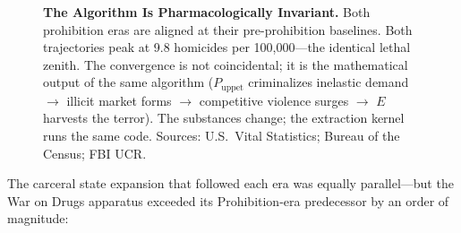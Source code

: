 \documentclass[12pt,openany]{book}
\begin{document}
\begin{figure}[htbp]
\begin{tikzpicture}
\end{tikzpicture}
\caption{\textbf{The Algorithm Is Pharmacologically Invariant.} Both prohibition eras are aligned at their pre-prohibition baselines. Both trajectories peak at 9.8 homicides per 100,000---the identical lethal zenith. The convergence is not coincidental; it is the mathematical output of the same algorithm ($P_{\text{uppet}}$ criminalizes inelastic demand $\rightarrow$ illicit market forms $\rightarrow$ competitive violence surges $\rightarrow$ $E$ harvests the terror). The substances change; the extraction kernel runs the same code. Sources: U.S.\ Vital Statistics; Bureau of the Census; FBI UCR.}
\label{fig:dual_era_homicide}
\end{figure}

The carceral state expansion that followed each era was equally parallel---but the War on Drugs apparatus exceeded its Prohibition-era predecessor by an order of magnitude:
\end{document}
